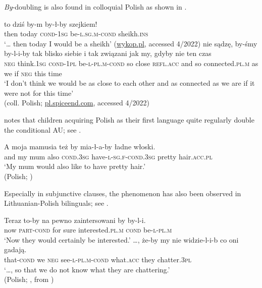 \documentclass[output=paper]{langscibook}
\begin{document}
\noindent \textit{By}-doubling is also found in colloquial Polish as shown in .

\ea
\ea\gll {\ldots} to dziś by-m by-ł-by szejkiem! \\
{} then today \textsc{cond-1sg} be\textsc{-l.sg.m-cond} sheikh.\textsc{ins} \\
\glt `{\ldots} then today I would be a sheikh' \hfill (\href{https://www.wykop.pl/link/2244300/comment/24557794}{wykop.pl}, accessed 4/2022)
\label{pitsch:ex:doubling_Polish_coll_a}
\ex\gll nie sądzę, by-śmy by-l-i-by tak blisko siebie i tak związani jak my, gdyby nie ten czas \\
\textsc{neg} think.\textsc{1sg} \textsc{cond-1pl} be\textsc{-l-pl.m-cond} so close \textsc{refl.acc} and so connected.\textsc{pl.m} as we if \textsc{neg} this time \\
\glt `I don't think we would be as close to each other and as connected as we are if it were not for this time' \\ \hfill (coll. Polish; \href{https://pl.spiceend.com/little-couplesneak-peek}{pl.spiceend.com}, accessed 4/2022)
\label{pitsch:ex:doubling_Polish_coll_b}
\z
\label{pitsch:ex:doubling_Polish_coll}
\z

\noindent \citet[624]{Smoczynska1985} notes that children acquiring Polish as their first language quite regularly double the conditional AU; see .

\ea\gll A moja mamusia też by mia-ł-a-by {ładne włoski}. \\ 
and my mum also \textsc{cond.3sg} have\textsc{-l-sg.f-cond.3sg} {pretty hair}.\textsc{acc.pl} \\ 
\glt `My mum would also like to have pretty hair.' \\ \hfill (Polish; \citealt[from][119]{Blaszczyk2018})
\label{pitsch:ex:doubling_Polish_acq}
\z

\noindent Especially in subjunctive clauses, the phenomenon has also been observed in Lithuanian-Polish bilinguals; see .\largerpage[-1]

\ea 
\ea\gll Teraz to-by na pewno zaintersowani by by-l-i. \\
now \textsc{part-cond} for sure interested.\textsc{pl.m} \textsc{cond} be\textsc{-l-pl.m} \\  
\glt `Now they would certainly be interested.'  
\ex\gll \ldots, że-by my nie widzie-l-i-b co oni gadają. \\
{} that-\textsc{cond} we \textsc{neg} see\textsc{-l-pl.m-cond} what.\textsc{acc} they chatter.\textsc{3pl} \\   
\glt `\ldots, so that we do not know what they are chattering.' \\ \hfill (Polish; \citealt[58]{Smulkowa1999}, from \citealt[132]{Blaszczyk2018})
\z
\label{pitsch:ex:doubling_Polish_biling}
\z 
\end{document}
